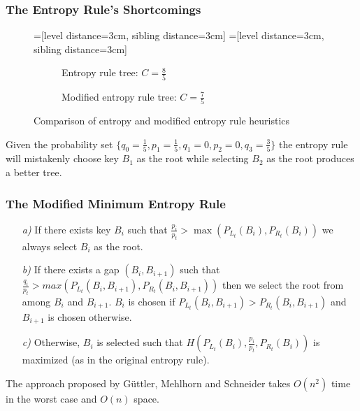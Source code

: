\documentclass[]{beamer}
\theoremstyle{plain}
\begin{document}
\begin{frame} \frametitle{The Entropy Rule's Shortcomings}

\begin{figure}[H]
\centering
=[level distance=3cm, sibling distance=3cm]
=[level distance=3cm, sibling distance=3cm]
\scriptsize
\begin{subfigure}{.46\textwidth}
\centering
{}
\caption{Entropy rule tree: $C=\frac{8}{5}$}
\end{subfigure}
\begin{subfigure}{.46\textwidth}
\centering
{}
\caption{Modified entropy rule tree: $C=\frac{7}{5}$}
\end{subfigure}
\caption{Comparison of entropy and modified entropy rule heuristics}
\end{figure}

Given the probability set $\{q_0 = \frac{1}{5}, p_1 = \frac{1}{5}, q_1 = 0, p_2 = 0, q_3 = \frac{3}{5}\}$ the entropy rule will mistakenly choose key $B_1$ as the root while selecting $B_2$ as the root produces a better tree.

\end{frame}

\begin{frame} \frametitle{The Modified Minimum Entropy Rule}

\begin{itemize}
\item[\textit{a)}] If there exists key $B_i$ such that $\frac{p_i}{p_t} > \max(P_{L_t}(B_i), P_{R_t}(B_i))$ we always select $B_i$ as the root.

\item[\textit{b)}] If there exists a gap $(B_i, B_{i+1})$ such that $\frac{q_i}{p_t} > max(P_{L_t}(B_i, B_{i+1}), P_{R_t}(B_i, B_{i+1}))$ then we select the root from among $B_i$ and $B_{i+1}$. $B_i$ is chosen if $P_{L_t}(B_i, B_{i+1}) > P_{R_t}(B_i, B_{i+1})$ and $B_{i+1}$ is chosen otherwise.

\item[\textit{c)}] Otherwise, $B_i$ is selected such that $H(P_{L_t}(B_i), \frac{p_i}{p_t}, P_{R_t}(B_i))$ is maximized (as in the original entropy rule).

\end{itemize}
The approach proposed by G{\"u}ttler, Mehlhorn and Schneider takes $O(n^2)$ time in the worst case and $O(n)$ space.
\end{frame}
\end{document}
